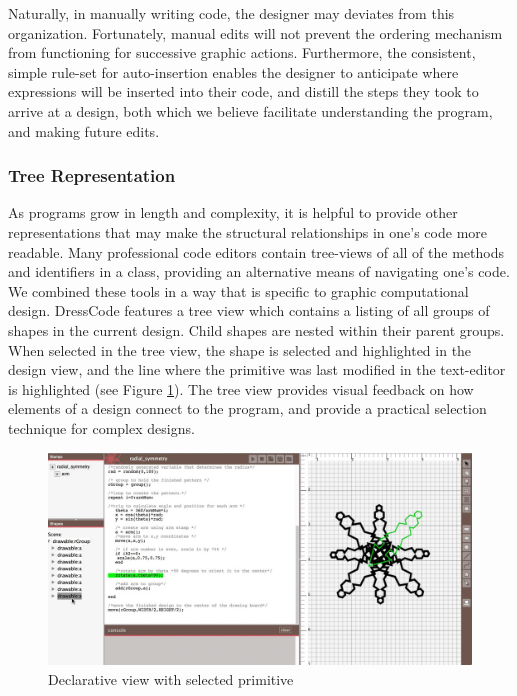 \documentclass{sigchi}
\begin{document}
Naturally, in manually writing code, the designer may deviates from this organization. Fortunately, manual edits will not prevent the ordering mechanism from functioning for successive graphic actions. Furthermore, the consistent, simple rule-set for auto-insertion enables the designer to anticipate where expressions will be inserted into their code, and distill the steps they took to arrive at a design, both which we believe facilitate understanding the program, and making future edits.

\subsubsection{Tree Representation}
As programs grow in length and complexity, it is helpful to provide other representations that may make the structural relationships in one's code more readable. Many professional code editors contain tree-views of all of the methods and identifiers in a class, providing an alternative means of navigating one's code. We combined these tools in a way that is specific to graphic computational design. DressCode features a tree view which contains a listing of all groups of shapes in the current design. Child shapes are nested within their parent groups. When selected in the tree view, the shape is selected and highlighted in the design view, and the line where the primitive was last modified in the text-editor is highlighted (see Figure \ref{fig:declarative_view}). The tree view provides visual feedback on how elements of a design connect to the program, and provide a practical selection technique for complex designs.

\begin{center}
\begin{figure}[h!]
\includegraphics[width=\columnwidth]{images/selection_mechanism.jpg}
\caption{Declarative view with selected primitive}
\label{fig:declarative_view}
\end{figure}
\end{center}
\vspace{-20pt}
\end{document}
